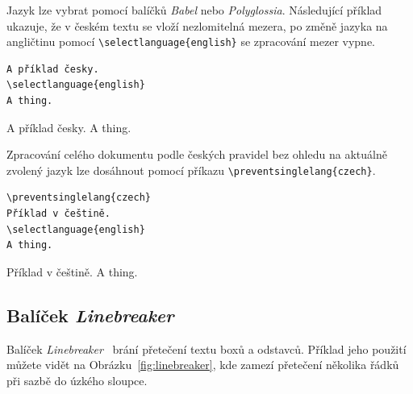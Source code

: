 \documentclass{csbulletin}
\newcommand\balicek[1]{\textit{#1}}
\begin{document}
Jazyk lze  vybrat pomocí balíčků \balicek{Babel} nebo \balicek{Polyglossia}. Následující příklad
ukazuje, že v českém textu se vloží nezlomitelná mezera, po změně jazyka na angličtinu pomocí
\verb|\selectlanguage{english}| se zpracování mezer vypne. 
  


\begin{verbatim}
A příklad česky.
\selectlanguage{english}
A thing.
\end{verbatim}

\preventsingledebugon

\noindent 
A příklad česky.
A thing.

\preventsingledebugoff



\bigskip

Zpracování celého dokumentu podle českých pravidel bez ohledu na aktuálně zvolený jazyk lze dosáhnout pomocí příkazu 
\verb|\preventsinglelang{czech}|.

\begin{verbatim}
\preventsinglelang{czech}
Příklad v češtině.
\selectlanguage{english}
A thing.
\end{verbatim}

\preventsingledebugon

\noindent Příklad v češtině.
A thing.

\preventsingledebugoff

\subsection{Balíček \balicek{Linebreaker}}

\newcommand\testbox[1]{%
  \parbox{120pt}{%
    \parindent=15pt%
    \tolerance=1%
    \pretolerance=1%
    #1
  }%
}


\newcommand\printtest[1]{%
  \linebreakerdisable%
  \begin{subfigure}[b]{.45\textwidth}
    \centering
  \noindent\testbox{%
    #1
  }%
  \caption{Bez balíčku \balicek{Linebreaker}}
  \end{subfigure}
  \linebreakerenable%
  \hfill%
  \begin{subfigure}[b]{.45\textwidth}
    \centering
  \testbox{%
    #1
  }%
  \medskip
  \caption{S balíčkem \balicek{Linebreaker}}
  \end{subfigure}
}

Balíček \balicek{Linebreaker}~\cite{linebreaker} brání přetečení textu boxů a odstavců. 
Příklad jeho použití můžete vidět na Obrázku~\ref{fig:linebreaker}, kde zamezí přetečení 
několika řádků při sazbě do úzkého sloupce. 
\end{document}
